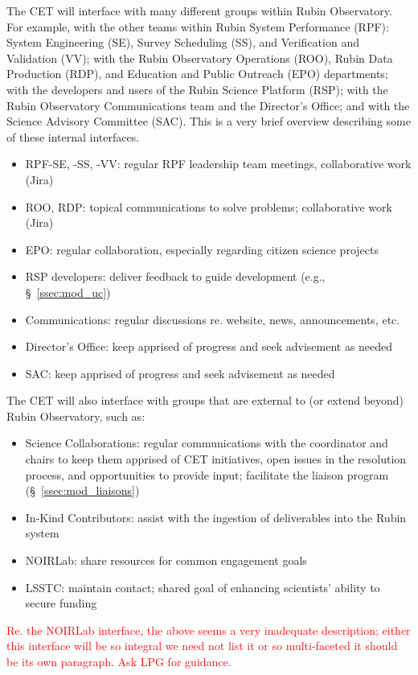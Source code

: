 \documentclass[DM,lsstdraft,toc]{lsstdoc}
\begin{document}
The CET will interface with many different groups within Rubin Observatory.
For example, with the other teams within Rubin System Performance (RPF): System Engineering (SE), Survey Scheduling (SS), and Verification and Validation (VV); with the Rubin Observatory Operations (ROO), Rubin Data Production (RDP), and Education and Public Outreach (EPO) departments; with the developers and users of the Rubin Science Platform (RSP); with the Rubin Observatory Communications team and the Director's Office; and with the Science Advisory Committee (SAC). 
This is a very brief overview describing some of these internal interfaces.
\begin{itemize}
\item RPF-SE, -SS, -VV: regular RPF leadership team meetings, collaborative work (Jira)
\item ROO, RDP: topical communications to solve problems; collaborative work (Jira)
\item EPO: regular collaboration, especially regarding citizen science projects
\item RSP developers: deliver feedback to guide development (e.g., \S~\ref{ssec:mod_uc})
\item Communications: regular discussions re. website, news, announcements, etc.
\item Director's Office: keep apprised of progress and seek advisement as needed
\item SAC: keep apprised of progress and seek advisement as needed
\end{itemize}

The CET will also interface with groups that are external to (or extend beyond) Rubin Observatory, such as:
\begin{itemize}
\item Science Collaborations: regular communications with the coordinator and chairs to keep them apprised of CET initiatives, open issues in the resolution process, and opportunities to provide input; facilitate the liaison program (\S~\ref{ssec:mod_liaisons})
\item In-Kind Contributors: assist with the ingestion of deliverables into the Rubin system
\item NOIRLab: share resources for common engagement goals
\item LSSTC: maintain contact; shared goal of enhancing scientists' ability to secure funding
\end{itemize}

\textcolor{red}{Re. the NOIRLab interface, the above seems a very inadequate description; either this interface will be so integral we need not list it or so multi-faceted it should be its own paragraph. Ask LPG for guidance.}
\end{document}
